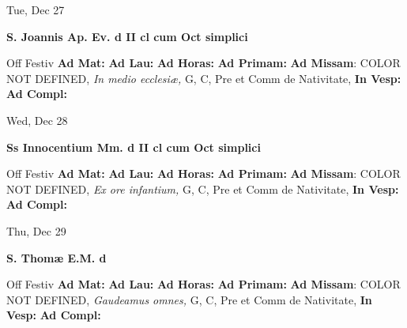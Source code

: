 \documentclass[10pt]{memoir}
\begin{document}
\begin{center}
\begin{minipage}{3.5in}
\vspace{2em}
\begin{center}Tue, Dec 27
\end{center}
\textbf{ \large S. Joannis Ap. Ev.
\textnormal{\normalsize d II cl cum Oct simplici}}

\begin{justify}Off Festiv
\textbf{Ad Mat: }
\textbf{Ad Lau: }
\textbf{Ad Horas: }
\textbf{Ad Primam: }\textbf{Ad Missam}: COLOR NOT DEFINED, \textit{In medio ecclesiæ,} G, C, Pre et Comm de Nativitate, 
\textbf{In Vesp: }
\textbf{Ad Compl: }
\end{justify}
\end{minipage}
\end{center}

\begin{center}
\begin{minipage}{3.5in}
\vspace{2em}
\begin{center}Wed, Dec 28
\end{center}
\textbf{ \large Ss Innocentium Mm.
\textnormal{\normalsize d II cl cum Oct simplici}}

\begin{justify}Off Festiv
\textbf{Ad Mat: }
\textbf{Ad Lau: }
\textbf{Ad Horas: }
\textbf{Ad Primam: }\textbf{Ad Missam}: COLOR NOT DEFINED, \textit{Ex ore infantium,} G, C, Pre et Comm de Nativitate, 
\textbf{In Vesp: }
\textbf{Ad Compl: }
\end{justify}
\end{minipage}
\end{center}

\begin{center}
\begin{minipage}{3.5in}
\vspace{2em}
\begin{center}Thu, Dec 29
\end{center}
\textbf{ \large S. Thomæ E.M.
\textnormal{\normalsize d}}

\begin{justify}Off Festiv
\textbf{Ad Mat: }
\textbf{Ad Lau: }
\textbf{Ad Horas: }
\textbf{Ad Primam: }\textbf{Ad Missam}: COLOR NOT DEFINED, \textit{Gaudeamus omnes,} G, C, Pre et Comm de Nativitate, 
\textbf{In Vesp: }
\textbf{Ad Compl: }
\end{justify}
\end{minipage}
\end{center}
\end{document}
